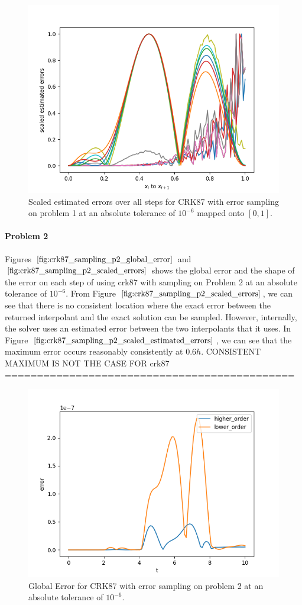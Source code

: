 \begin{figure}[H]
\centering
\includegraphics[width=0.7\linewidth]{./figures/crk87_sampling_p1_scaled_estimated_errors}
\caption{Scaled estimated errors over all steps for CRK87 with error sampling on problem 1 at an absolute tolerance of $10^{-6}$ mapped onto $[0, 1]$.}
\label{fig:crk87_sampling_p1_scaled_estimated_errors}
\end{figure}


\paragraph{Problem 2} Figures $\ref{fig:crk87_sampling_p2_global_error}$ and $\ref{fig:crk87_sampling_p2_scaled_errors}$ shows the global error and the shape of the error on each step of using crk87 with sampling on Problem 2 at an absolute tolerance of $10^{-6}$. From Figure $\ref{fig:crk87_sampling_p2_scaled_errors}$, we can see that there is no consistent location where the exact error between the returned interpolant and the exact solution can be sampled. However, internally, the solver uses an estimated error between the two interpolants that it uses. In Figure $\ref{fig:crk87_sampling_p2_scaled_estimated_errors}$, we can see that the maximum error occurs reasonably consistently at $0.6h$.  CONSISTENT MAXIMUM IS NOT THE CASE FOR crk87 =============================================

\begin{figure}[H]
\centering
\includegraphics[width=0.7\linewidth]{./figures/crk87_sampling_p2_global_error}
\caption{Global Error for CRK87 with error sampling on problem 2 at an absolute tolerance of $10^{-6}$.}
\label{fig:crk87_sampling_p2_global_error}
\end{figure}

